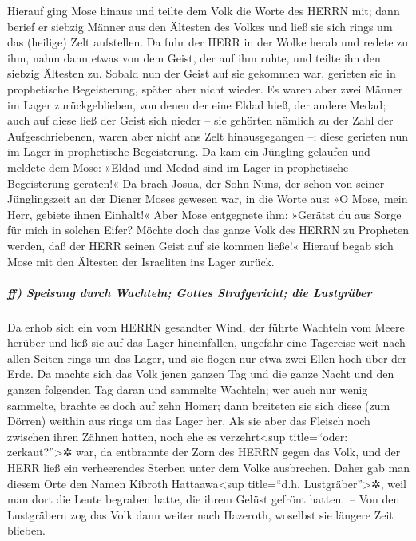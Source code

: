 Hierauf ging Mose hinaus und teilte dem Volk die Worte
des HERRN mit; dann berief er siebzig Männer aus den Ältesten des Volkes
und ließ sie sich rings um das (heilige) Zelt aufstellen.
Da fuhr der HERR in der Wolke herab und redete zu ihm,
nahm dann etwas von dem Geist, der auf ihm ruhte, und teilte ihn den
siebzig Ältesten zu. Sobald nun der Geist auf sie gekommen war, gerieten
sie in prophetische Begeisterung, später aber nicht wieder.
Es waren aber zwei Männer im Lager zurückgeblieben, von
denen der eine Eldad hieß, der andere Medad; auch auf diese ließ der
Geist sich nieder -- sie gehörten nämlich zu der Zahl der
Aufgeschriebenen, waren aber nicht ans Zelt hinausgegangen --; diese
gerieten nun im Lager in prophetische Begeisterung. Da
kam ein Jüngling gelaufen und meldete dem Mose: »Eldad und Medad sind im
Lager in prophetische Begeisterung geraten!« Da brach
Josua, der Sohn Nuns, der schon von seiner Jünglingszeit an der Diener
Moses gewesen war, in die Worte aus: »O Mose, mein Herr, gebiete ihnen
Einhalt!« Aber Mose entgegnete ihm: »Gerätst du aus Sorge
für mich in solchen Eifer? Möchte doch das ganze Volk des HERRN zu
Propheten werden, daß der HERR seinen Geist auf sie kommen ließe!«
Hierauf begab sich Mose mit den Ältesten der Israeliten
ins Lager zurück.

\hypertarget{ff-speisung-durch-wachteln-gottes-strafgericht-die-lustgruxe4ber}{%
\subparagraph{ff) Speisung durch Wachteln; Gottes Strafgericht; die
Lustgräber}\label{ff-speisung-durch-wachteln-gottes-strafgericht-die-lustgruxe4ber}}

Da erhob sich ein vom HERRN gesandter Wind, der führte
Wachteln vom Meere herüber und ließ sie auf das Lager hineinfallen,
ungefähr eine Tagereise weit nach allen Seiten rings um das Lager, und
sie flogen nur etwa zwei Ellen hoch über der Erde. Da
machte sich das Volk jenen ganzen Tag und die ganze Nacht und den ganzen
folgenden Tag daran und sammelte Wachteln; wer auch nur wenig sammelte,
brachte es doch auf zehn Homer; dann breiteten sie sich diese (zum
Dörren) weithin aus rings um das Lager her. Als sie aber
das Fleisch noch zwischen ihren Zähnen hatten, noch ehe es
verzehrt\textless sup title=``oder: zerkaut?''\textgreater✲ war, da
entbrannte der Zorn des HERRN gegen das Volk, und der HERR ließ ein
verheerendes Sterben unter dem Volke ausbrechen. Daher
gab man diesem Orte den Namen Kibroth Hattaawa\textless sup title=``d.h.
Lustgräber''\textgreater✲, weil man dort die Leute begraben hatte, die
ihrem Gelüst gefrönt hatten.~-- Von den Lustgräbern zog
das Volk dann weiter nach Hazeroth, woselbst sie längere Zeit blieben.

